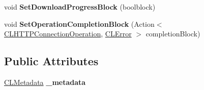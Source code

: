\begin{DoxyCompactItemize}
\item 
\hypertarget{class_cloud_api_public_1_1_support_1_1_c_l_h_t_t_p_connection_operation_aca18f699190bd52e5bb8858a5761cef7}{void {\bfseries Set\-Download\-Progress\-Block} (boolblock)}\label{class_cloud_api_public_1_1_support_1_1_c_l_h_t_t_p_connection_operation_aca18f699190bd52e5bb8858a5761cef7}

\item 
\hypertarget{class_cloud_api_public_1_1_support_1_1_c_l_h_t_t_p_connection_operation_a00da9ac05ab2de6a995bafcc85849746}{void {\bfseries Set\-Operation\-Completion\-Block} (Action$<$ \hyperlink{class_cloud_api_public_1_1_support_1_1_c_l_h_t_t_p_connection_operation}{C\-L\-H\-T\-T\-P\-Connection\-Operation}, \hyperlink{class_cloud_api_public_1_1_model_1_1_c_l_error}{C\-L\-Error} $>$ completion\-Block)}\label{class_cloud_api_public_1_1_support_1_1_c_l_h_t_t_p_connection_operation_a00da9ac05ab2de6a995bafcc85849746}

\end{DoxyCompactItemize}
\subsection*{Public Attributes}
\begin{DoxyCompactItemize}
\item 
\hypertarget{class_cloud_api_public_1_1_support_1_1_c_l_h_t_t_p_connection_operation_a3ce790137d734869f22b1e8dda2d3537}{\hyperlink{class_cloud_api_public_1_1_model_1_1_c_l_metadata}{C\-L\-Metadata} {\bfseries \-\_\-metadata}}\label{class_cloud_api_public_1_1_support_1_1_c_l_h_t_t_p_connection_operation_a3ce790137d734869f22b1e8dda2d3537}

\end{DoxyCompactItemize}
